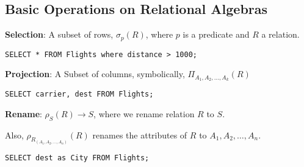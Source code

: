 \documentclass{article}
\begin{document}
\subsection*{Basic Operations on Relational Algebras}

\begin{outline}

 
    
    
   

    
\1  \textbf{Selection}: A subset of rows, $\sigma_p(R)$, where $p$ is a predicate and $R$ a relation. 
       
       
   
       
 

\begin{lstlisting}[frame=single]  
SELECT * FROM Flights where distance > 1000;
\end{lstlisting} 
%
%      
        
         


   
   
   
   \1  \textbf{Projection}: A Subset of columns, symbolically, 
        $\Pi_{A_1, A_2, \dots, A_k}(R)$
               
        

\begin{lstlisting}[frame=single]  
SELECT carrier, dest FROM Flights;
\end{lstlisting} 
%
%      
    
               
         

\1 \textbf{Rename}: $\rho_S(R) \to S$, where we rename relation $R$ to $S$.

Also, $\rho_R_{(A_1, A_2, \dots , A_n)}(R)$ renames the attributes of $R$
to $A_1, A_2, \dots , A_n$.  



\begin{lstlisting}[frame=single]  
SELECT dest as City FROM Flights;
\end{lstlisting} 
%
%
        
\end{outline} 


 

\end{document}
